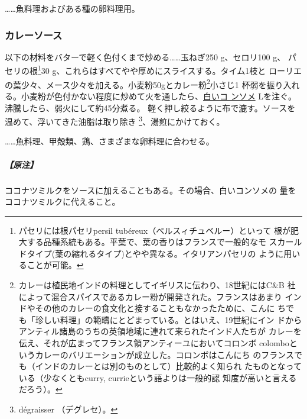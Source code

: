 \begin{recette}
\ldots{}\ldots{}魚料理およびある種の卵料理用。

\maeaki

\hypertarget{sauce-currie}{%
\subsubsection{カレーソース}\label{sauce-currie}}



以下の材料をバターで軽く色付くまで炒める\ldots{}\ldots{}玉ねぎ250
g、セロリ100 g、 パセリの根\footnote{パセリには根パセリpersil
  tubéreux（ペルスィチュベルー）といって
  根が肥大する品種系統もある。平葉で、葉の香りはフランスで一般的なモ
  スカールドタイプ(葉の縮れるタイプ)とやや異なる。イタリアンパセリの
  ように用いることが可能。}30
g、これらはすべてやや厚めにスライスする。タイム1枝と
ローリエの葉少々、メース少々を加える。小麦粉50gとカレー粉\footnote{カレーは植民地インドの料理としてイギリスに伝わり、18世紀にはC\&B
  社によって混合スパイスであるカレー粉が開発された。フランスはあまり
  インドやその他のカレーの食文化と接することもなかったために、こんに
  ちでも「珍しい料理」の範疇にとどまっている。とはいえ、19世紀にイン
  ドからアンティル諸島のうちの英領地域に連れて来られたインド人たちが
  カレーを伝え、それが広まってフランス領アンティーユにおいてコロンボ
  colomboというカレーのバリエーションが成立した。コロンボはこんにち
  のフランスでも（インドのカレーとは別のものとして）比較的よく知られ
  たものとなっている（少なくともcurry, currieという語よりは一般的認
  知度が高いと言えるだろう）。}小さじ1
杯弱を振り入れる。小麦粉が色付かない程度に炒めて火を通したら、\protect\hyperlink{}{白いコ
ンソメ} \troisquarts{} Lを注ぐ。沸騰したら、弱火にして約45分煮る。
軽く押し絞るように布で漉す。ソースを温めて、浮いてきた油脂は取り除き
\footnote{dégraisser （デグレセ）。}、湯煎にかけておく。

\ldots{}\ldots{}魚料理、甲殻類、鶏、さまざまな卵料理に合わせる。

\hypertarget{ux539fux6ce8-3}{%
\subparagraph{【原注】}\label{ux539fux6ce8-3}}

ココナツミルクをソースに加えることもある。その場合、白いコンソメの
\unquart{}量をココナツミルクに代えること。


\end{recette}
